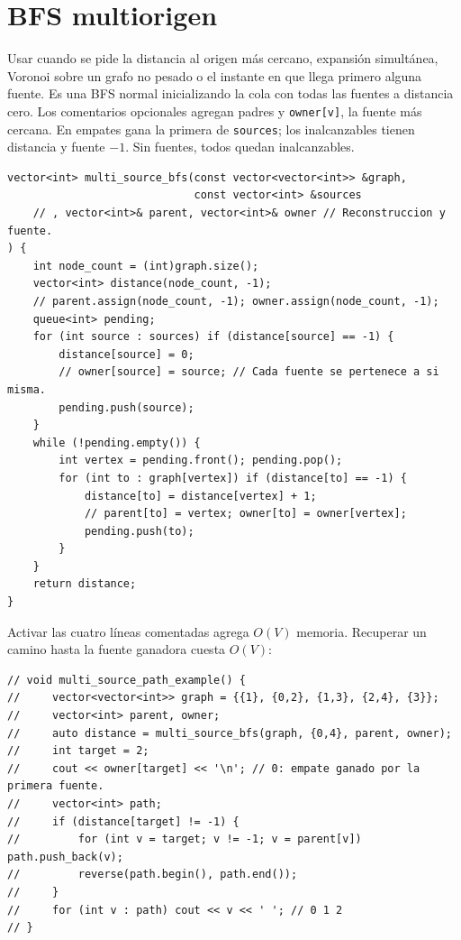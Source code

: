 \section{BFS multiorigen}

Usar cuando se pide la distancia al origen m\'as cercano, expansi\'on simult\'anea,
Voronoi sobre un grafo no pesado o el instante en que llega primero alguna fuente.
Es una BFS normal inicializando la cola con todas las fuentes a distancia cero.
Los comentarios opcionales agregan padres y \texttt{owner[v]}, la fuente
m\'as cercana. En empates gana la primera de \texttt{sources}; los inalcanzables
tienen distancia y fuente $-1$. Sin fuentes, todos quedan inalcanzables.


\begin{lstlisting}[style=cpp]
vector<int> multi_source_bfs(const vector<vector<int>> &graph,
                             const vector<int> &sources
    // , vector<int>& parent, vector<int>& owner // Reconstruccion y fuente.
) {
    int node_count = (int)graph.size();
    vector<int> distance(node_count, -1);
    // parent.assign(node_count, -1); owner.assign(node_count, -1);
    queue<int> pending;
    for (int source : sources) if (distance[source] == -1) {
        distance[source] = 0;
        // owner[source] = source; // Cada fuente se pertenece a si misma.
        pending.push(source);
    }
    while (!pending.empty()) {
        int vertex = pending.front(); pending.pop();
        for (int to : graph[vertex]) if (distance[to] == -1) {
            distance[to] = distance[vertex] + 1;
            // parent[to] = vertex; owner[to] = owner[vertex];
            pending.push(to);
        }
    }
    return distance;
}
\end{lstlisting}

Activar las cuatro l\'ineas comentadas agrega $O(V)$ memoria. Recuperar un
camino hasta la fuente ganadora cuesta $O(V)$:
\begin{lstlisting}[style=cpp]
// void multi_source_path_example() {
//     vector<vector<int>> graph = {{1}, {0,2}, {1,3}, {2,4}, {3}};
//     vector<int> parent, owner;
//     auto distance = multi_source_bfs(graph, {0,4}, parent, owner);
//     int target = 2;
//     cout << owner[target] << '\n'; // 0: empate ganado por la primera fuente.
//     vector<int> path;
//     if (distance[target] != -1) {
//         for (int v = target; v != -1; v = parent[v]) path.push_back(v);
//         reverse(path.begin(), path.end());
//     }
//     for (int v : path) cout << v << ' '; // 0 1 2
// }
\end{lstlisting}

